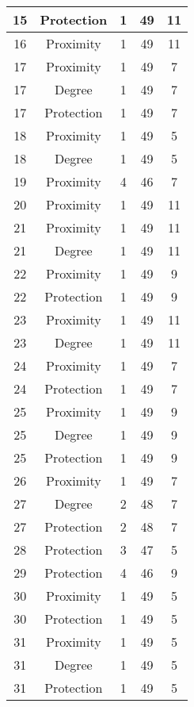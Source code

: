 \documentclass[results.tex]{subfiles}
\begin{document}
\begin{center}
\begin{tabular}{| c || c | c | c | c |}
    \hline
    15 & Protection & 1 & 49 & 11 \\ 
    \hline
    16 & Proximity & 1 & 49 & 11 \\ 
    \hline
    17 & Proximity & 1 & 49 & 7 \\ 
    \hline
    17 & Degree & 1 & 49 & 7 \\ 
    \hline
    17 & Protection & 1 & 49 & 7 \\ 
    \hline
    18 & Proximity & 1 & 49 & 5 \\ 
    \hline
    18 & Degree & 1 & 49 & 5 \\ 
    \hline
    19 & Proximity & 4 & 46 & 7 \\ 
    \hline
    20 & Proximity & 1 & 49 & 11 \\ 
    \hline
    21 & Proximity & 1 & 49 & 11 \\ 
    \hline
    21 & Degree & 1 & 49 & 11 \\ 
    \hline
    22 & Proximity & 1 & 49 & 9 \\ 
    \hline
    22 & Protection & 1 & 49 & 9 \\ 
    \hline
    23 & Proximity & 1 & 49 & 11 \\ 
    \hline
    23 & Degree & 1 & 49 & 11 \\ 
    \hline
    24 & Proximity & 1 & 49 & 7 \\ 
    \hline
    24 & Protection & 1 & 49 & 7 \\ 
    \hline
    25 & Proximity & 1 & 49 & 9 \\ 
    \hline
    25 & Degree & 1 & 49 & 9 \\ 
    \hline
    25 & Protection & 1 & 49 & 9 \\ 
    \hline
    26 & Proximity & 1 & 49 & 7 \\ 
    \hline
    27 & Degree & 2 & 48 & 7 \\ 
    \hline
    27 & Protection & 2 & 48 & 7 \\ 
    \hline
    28 & Protection & 3 & 47 & 5 \\ 
    \hline
    29 & Protection & 4 & 46 & 9 \\ 
    \hline
    30 & Proximity & 1 & 49 & 5 \\ 
    \hline
    30 & Protection & 1 & 49 & 5 \\ 
    \hline
    31 & Proximity & 1 & 49 & 5 \\ 
    \hline
    31 & Degree & 1 & 49 & 5 \\ 
    \hline
    31 & Protection & 1 & 49 & 5 \\ 

\end{tabular}
\end{center}
\end{document}
